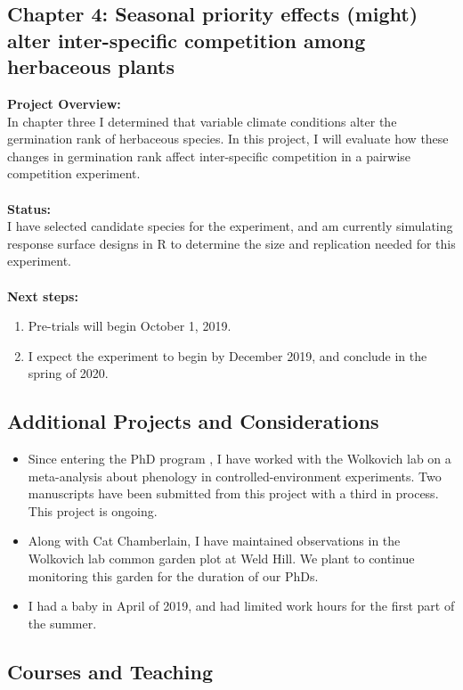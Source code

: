 \documentclass[11pt]{article}\usepackage[]{graphicx}\usepackage[]{color}
\begin{document}
\subsection*{Chapter 4: Seasonal priority effects (might) alter inter-specific competition among herbaceous plants}
\textbf{Project Overview:}\\
\indent In chapter three I determined that variable climate conditions alter the germination rank of herbaceous species. In this project, I will evaluate how these changes in germination rank affect inter-specific competition in a pairwise competition experiment.\\
\\
\textbf{Status:}\\
\indent I have selected candidate species for the experiment, and am currently simulating response surface designs in R to determine the size and replication needed for this experiment.\\
\\
\textbf{Next steps:}
\begin{enumerate}
\item Pre-trials will begin October 1, 2019.
\item I expect the experiment to begin by December 2019, and conclude in the spring of 2020.
\end{enumerate}

\subsection*{Additional Projects and Considerations}
\begin{itemize}
\item Since entering the PhD program , I have worked with the Wolkovich lab on a meta-analysis about phenology in controlled-environment experiments. Two manuscripts have been submitted from this project with a third in process. This project is ongoing.
\item Along with Cat Chamberlain, I have maintained observations in the Wolkovich lab common garden plot at Weld Hill. We plant to continue monitoring this garden for the duration of our PhDs.
\item I had a baby in April of 2019, and had limited work hours for the first part of the summer.

\end{itemize}
\subsection*{Courses and Teaching}
\end{document}
